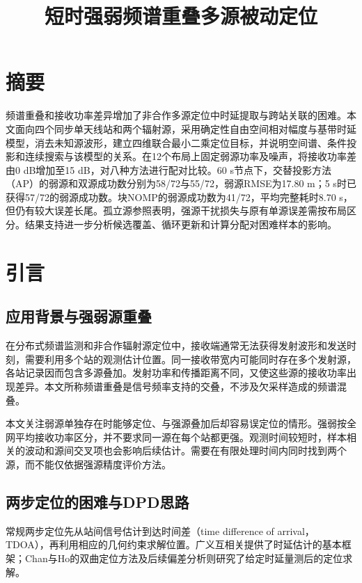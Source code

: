 \documentclass[11pt,a4paper]{article}
\title{\bfseries 短时强弱频谱重叠多源被动定位}
\author{}
\date{}
\numberwithin{equation}{section}
\numberwithin{figure}{section}
\numberwithin{table}{section}
\begin{document}
\maketitle
\section*{摘要}

频谱重叠和接收功率差异增加了非合作多源定位中时延提取与跨站关联的困难。本文面向四个同步单天线站和两个辐射源，采用确定性自由空间相对幅度与基带时延模型，消去未知源波形，建立四维联合最小二乘定位目标，并说明空间谱、条件投影和连续搜索与该模型的关系。在12个布局上固定弱源功率及噪声，将接收功率差由0 dB增加至15 dB，对八种方法进行配对比较。60 s节点下，交替投影方法（AP）的弱源和双源成功数分别为58/72与55/72，弱源RMSE为17.80 m；5 s时已获得57/72的弱源成功数。块NOMP的弱源成功数为41/72，平均完整耗时8.70 s，但仍有较大误差长尾。孤立源参照表明，强源干扰损失与原有单源误差需按布局区分。结果支持进一步分析候选覆盖、循环更新和计算分配对困难样本的影响。

\section{引言}\label{sec:1}

\subsection{应用背景与强弱源重叠}\label{sec:1.1}

在分布式频谱监测和非合作辐射源定位中，接收端通常无法获得发射波形和发送时刻，需要利用多个站的观测估计位置。同一接收带宽内可能同时存在多个发射源，各站记录因而包含多源叠加。发射功率和传播距离不同，又使这些源的接收功率出现差异。本文所称频谱重叠是信号频率支持的交叠，不涉及欠采样造成的频谱混叠。

本文关注弱源单独存在时能够定位、与强源叠加后却容易误定位的情形。强弱按全网平均接收功率区分，并不要求同一源在每个站都更强。观测时间较短时，样本相关的波动和源间交叉项也会影响后续估计。需要在有限处理时间内同时找到两个源，而不能仅依据强源精度评价方法。

\subsection{两步定位的困难与DPD思路}\label{sec:1.2}

常规两步定位先从站间信号估计到达时间差（time difference of arrival，TDOA），再利用相应的几何约束求解位置。广义互相关提供了时延估计的基本框架\cite{ref01}；Chan与Ho的双曲定位方法及后续偏差分析则研究了给定时延量测后的定位求解\cite{ref02,ref03}。
\end{document}
